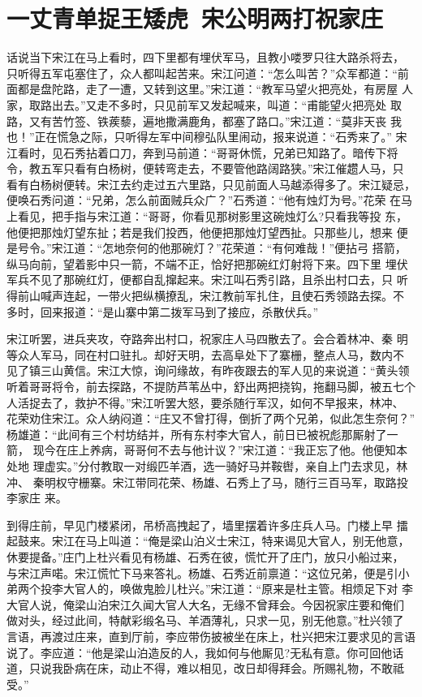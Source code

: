 \chapter{一丈青单捉王矮虎~宋公明两打祝家庄}

话说当下宋江在马上看时，四下里都有埋伏军马，且教小喽罗只往大路杀将去，
只听得五军屯塞住了，众人都叫起苦来。宋江问道：“怎么叫苦？”众军都道：“前
面都是盘陀路，走了一遭，又转到这里。”宋江道：“教军马望火把亮处，有房屋
人家，取路出去。”又走不多时，只见前军又发起喊来，叫道：“甫能望火把亮处
取路，又有苦竹签、铁蒺藜，遍地撒满鹿角，都塞了路口。”宋江道：“莫非天丧
我也！”正在慌急之际，只听得左军中间穆弘队里闹动，报来说道：“石秀来了。”
宋江看时，见石秀拈着口刀，奔到马前道：“哥哥休慌，兄弟已知路了。暗传下将
令，教五军只看有白杨树，便转弯走去，不要管他路阔路狭。”宋江催趱人马，只
看有白杨树便转。宋江去约走过五六里路，只见前面人马越添得多了。宋江疑忌，
便唤石秀问道：“兄弟，怎么前面贼兵众广？”石秀道：“他有烛灯为号。”花荣
在马上看见，把手指与宋江道：“哥哥，你看见那树影里这碗烛灯么?只看我等投
东，他便把那烛灯望东扯；若是我们投西，他便把那烛灯望西扯。只那些儿，想来
便是号令。”宋江道：“怎地奈何的他那碗灯？”花荣道：“有何难哉！”便拈弓
搭箭，纵马向前，望着影中只一箭，不端不正，恰好把那碗红灯射将下来。四下里
埋伏军兵不见了那碗红灯，便都自乱撺起来。宋江叫石秀引路，且杀出村口去，只
听得前山喊声连起，一带火把纵横撩乱，宋江教前军扎住，且使石秀领路去探。不
多时，回来报道：“是山寨中第二拨军马到了接应，杀散伏兵。”

宋江听罢，进兵夹攻，夺路奔出村口，祝家庄人马四散去了。会合着林冲、秦
明等众人军马，同在村口驻扎。却好天明，去高阜处下了寨栅，整点人马，数内不
见了镇三山黄信。宋江大惊，询问缘故，有昨夜跟去的军人见的来说道：“黄头领
听着哥哥将令，前去探路，不提防芦苇丛中，舒出两把挠钩，拖翻马脚，被五七个
人活捉去了，救护不得。”宋江听罢大怒，要杀随行军汉，如何不早报来，林冲、
花荣劝住宋江。众人纳闷道：“庄又不曾打得，倒折了两个兄弟，似此怎生奈何？”
杨雄道：“此间有三个村坊结并，所有东村李大官人，前日已被祝彪那厮射了一箭，
现今在庄上养病，哥哥何不去与他计议？”宋江道：“我正忘了他。他便知本处地
理虚实。”分付教取一对缎匹羊酒，选一骑好马并鞍辔，亲自上门去求见，林冲、
秦明权守栅寨。宋江带同花荣、杨雄、石秀上了马，随行三百马军，取路投李家庄
来。

到得庄前，早见门楼紧闭，吊桥高拽起了，墙里摆着许多庄兵人马。门楼上早
擂起鼓来。宋江在马上叫道：“俺是梁山泊义士宋江，特来谒见大官人，别无他意，
休要提备。”庄门上杜兴看见有杨雄、石秀在彼，慌忙开了庄门，放只小船过来，
与宋江声喏。宋江慌忙下马来答礼。杨雄、石秀近前禀道：“这位兄弟，便是引小
弟两个投李大官人的，唤做鬼脸儿杜兴。”宋江道：“原来是杜主管。相烦足下对
李大官人说，俺梁山泊宋江久闻大官人大名，无缘不曾拜会。今因祝家庄要和俺们
做对头，经过此间，特献彩缎名马、羊酒薄礼，只求一见，别无他意。”杜兴领了
言语，再渡过庄来，直到厅前，李应带伤披被坐在床上，杜兴把宋江要求见的言语
说了。李应道：“他是梁山泊造反的人，我如何与他厮见?无私有意。你可回他话
道，只说我卧病在床，动止不得，难以相见，改日却得拜会。所赐礼物，不敢祗受。”

